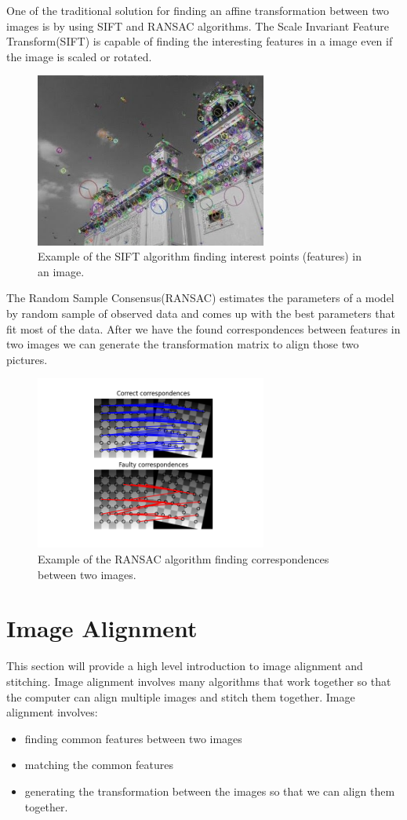 One of the traditional solution for finding an affine transformation between two images is by using SIFT and RANSAC algorithms. The Scale Invariant Feature Transform(SIFT) is capable of finding the interesting features in a image even if the image is scaled or rotated. \cite{lowe1999object}\\
\begin{figure}
	\centering
	\includegraphics[width=3.0in]{figs/sift}
    \caption{Example of the SIFT algorithm finding interest points (features) in an image.\cite{sift_cv}}
\end{figure}

The Random Sample Consensus(RANSAC) estimates the parameters of a model by random sample of observed data and comes up with the best parameters that fit most of the data. After we have the found correspondences between features in two images we can generate the transformation matrix to align those two pictures.
\begin{figure}
	\centering
	\includegraphics[width=3.0in]{figs/ransac_correct}
    \caption{Example of the RANSAC algorithm finding correspondences between two images.\cite{ransac_ski}}
\end{figure}

\section{Image Alignment}
This section will provide a high level introduction to image alignment and stitching. Image alignment involves many algorithms that work together so that the computer can align multiple images and stitch them together. Image alignment involves:
\begin{itemize}
\item finding common features between two images
\item matching the common features
\item generating the transformation between the images so that we can align them together.
\end{itemize}
 
